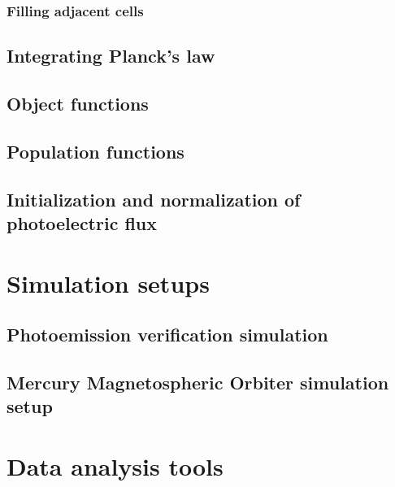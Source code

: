 \subsubsection{Filling adjacent cells}

\subsection{Integrating Planck's law}
\subsection{Object functions}
\subsection{Population functions}
\subsection{Initialization and normalization of photoelectric flux}

\section{Simulation setups}
\subsection{Photoemission verification simulation}
\subsection{Mercury Magnetospheric Orbiter simulation setup}

\section{Data analysis tools}